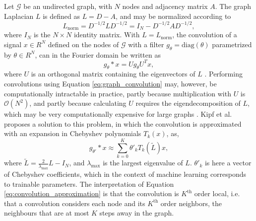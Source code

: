 Let $\mathcal{G}$ be an undirected graph, with $N$ nodes and adjacency matrix $A$. The graph Laplacian $L$ is defined as $L=D-A$, and may be normalized according to
\begin{equation}
    L_\text{norm} = D^{-1/2} L D^{-1/2} =  I_N - D^{-1/2} A D^{-1/2},
    \label{eq:normalized_graph_laplacian}
\end{equation}
where $I_N$ is the $N \times N$ identity matrix. With $L = L_{\text{norm}}$, the convolution of a signal $x \in R^N$ defined on the nodes of $\mathcal{G}$ with a filter $g_\theta = \text{diag}(\theta)$ parametrized by $\theta \in R^N$, can in the Fourier domain be written as
\begin{equation}
    g_\theta * x = U g_\theta U^T x,
    \label{eq:graph_convolution}
\end{equation}
where $U$ is an orthogonal matrix containing the eigenvectors of $L$ \cite{kipf_semi_supervised}. Performing convolutions using Equation \eqref{eq:graph_convolution} may, however, be computationally intractable in practice, partly because multiplication with $U$ is $\mathcal{O}(N^2)$, and partly because calculating $U$ requires the eigendecomposition of $L$, which may be very computationally expensive for large graphs \cite{kipf_semi_supervised}. Kipf et al. \cite{kipf_semi_supervised} proposes a solution to this problem, in which the convolution is approximated with an expansion in Chebyshev polynomials $T_k(x)$, as,
\begin{equation}
    g_{\theta'} * x \approx \sum_{k=0}^K \theta'_k T_k(\tilde{L})x,
    \label{eq:convolution_approximation}
\end{equation}
where $\tilde{L} =  \frac{2}{\lambda_{\text{max}}}L - I_N$, and $\lambda_{\text{max}}$ is the largest eigenvalue of $L$. $\theta'_k$ is here a vector of Chebyshev coefficients, which in the context of machine learning corresponds to trainable parameters. The interpretation of Equation \eqref{eq:convolution_approximation} is that the convolution is $K^{\text{th}}$ order local, i.e. that a convolution considers each node and its $K^{\text{th}}$ order neighbors, the neighbours that are at most $K$ steps away in the graph. 

